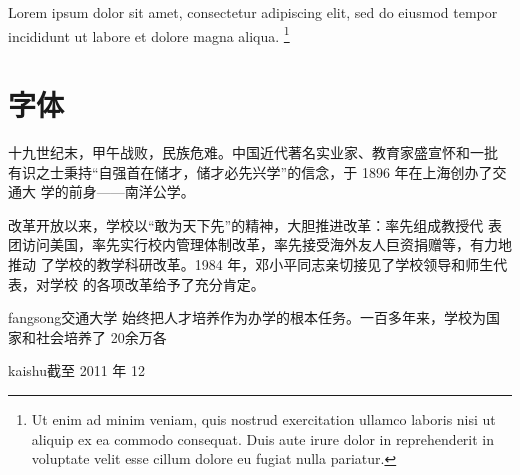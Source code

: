 Lorem ipsum dolor sit amet, consectetur adipiscing elit, sed do eiusmod tempor
incididunt ut labore et dolore magna aliqua. \footnote{Ut enim ad minim veniam,
quis nostrud exercitation ullamco laboris nisi ut aliquip ex ea commodo
consequat. Duis aute irure dolor in reprehenderit in voluptate velit esse cillum
dolore eu fugiat nulla pariatur.}

\section{字体}



{\songti 十九世纪末，甲午战败，民族危难。中国近代著名实业家、教育家盛宣怀和一批
  有识之士秉持“自强首在储才，储才必先兴学”的信念，于 1896 年在上海创办了交通大
  学的前身——南洋公学。}

{\heiti 改革开放以来，学校以“敢为天下先”的精神，大胆推进改革：率先组成教授代
  表团访问美国，率先实行校内管理体制改革，率先接受海外友人巨资捐赠等，有力地推动
  了学校的教学科研改革。1984 年，邓小平同志亲切接见了学校领导和师生代表，对学校
  的各项改革给予了充分肯定。}

{\ifcsname fangsong\endcsname\fangsong\else[无 \cs{fangsong} 字体。]\fi 交通大学
  始终把人才培养作为办学的根本任务。一百多年来，学校为国家和社会培养了 20余万各
  }

{\ifcsname kaishu\endcsname\kaishu\else[无 \cs{kaishu} 字体。]\fi 截至 2011 年 12
 }
